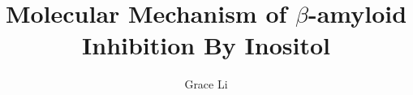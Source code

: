 \documentclass[12pt,singlespaced,narrowmargins]{ut-thesis}
\author{Grace Li}
\title{Molecular Mechanism of $\beta$-amyloid Inhibition By Inositol}
\begin{document}
\begin{preliminary}

\maketitle

\cleardoublepage

% 


% 


% 

\tableofcontents




\end{preliminary}
\end{document}

